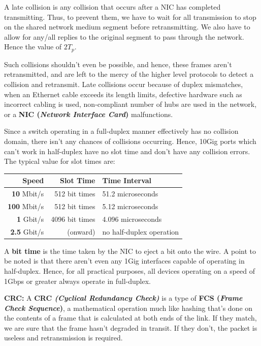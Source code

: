 A late collision is any collision that occurs after a NIC has completed transmitting. Thus, to prevent them, we have to wait for all transmission to stop on the shared network medium segment before retransmitting. We also have to allow for any/all replies to the original segment to pass through the network. Hence the value of $2T_p$. 

Such collisions shouldn't even be possible, and hence, these frames aren't retransmitted, and are left to the mercy of the higher level protocols to detect a collision and retransmit. Late collisions occur because of duplex mismatches, when an Ethernet cable exceeds its length limits, defective hardware such as incorrect cabling is used, non-compliant number of hubs are used in the network, or a \textbf{NIC (\textit{Network Interface Card})} malfunctions.

Since a switch operating in a full-duplex manner effectively has no collision domain, there isn't any chances of collisions occurring. Hence, 10Gig ports which can't work in half-duplex have no slot time and don't have any collision errors. The typical value for slot times are: 

\vspace{-10pt}
\begin{center}
\begin{tabular}{rrl}
\toprule
\textbf{Speed} &\textbf{Slot Time} &\textbf{Time Interval}\\
\midrule
\textbf{10} Mbit/s	&512 bit times	&51.2 microseconds\\
\textbf{100} Mbit/s	&512 bit times	&5.12 microseconds\\
\textbf{1} Gbit/s	&4096 bit times	&4.096 microseconds\\
\textbf{2.5} Gbit/s	&(onward)		&no half-duplex operation\\
\bottomrule
\end{tabular}
\end{center}
\vspace{-10pt}
\noindent
A \textbf{bit time} is the time taken by the NIC to eject a bit onto the wire. A point to be noted is that there aren't even any 1Gig interfaces capable of operating in half-duplex. Hence, for all practical purposes, all devices operating on a speed of 1Gbps or greater always operate in full-duplex. 

\noindent
\textbf{CRC:} A \textbf{CRC \textit{(Cyclical Redundancy Check)}} is a type of \textbf{FCS (\textit{Frame Check Sequence})}, a mathematical operation much like hashing that's done on the contents of a frame that is calculated at both ends of the link. If they match, we are sure that the frame hasn't degraded in transit. If they don't, the packet is useless and retransmission is required. 

